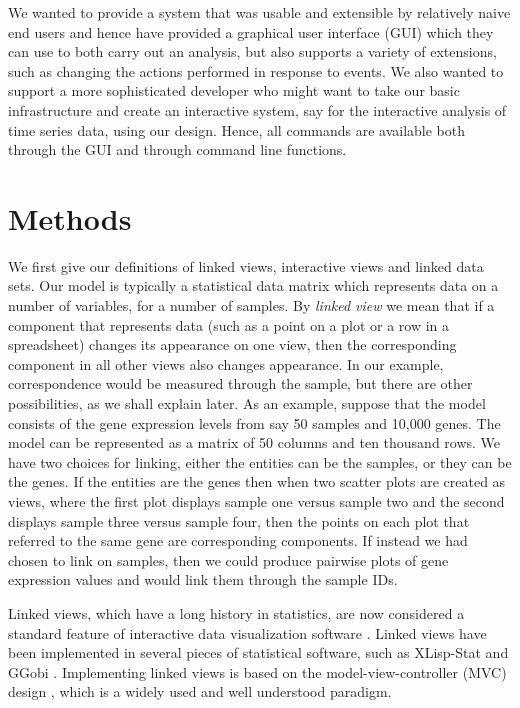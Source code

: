 \documentclass{article}[11pt]
\begin{document}
We wanted to provide a system that was usable and extensible by
relatively naive end users and hence have provided a graphical user
interface (GUI) which they can use to both carry out an analysis, but
also supports a variety of extensions, such as changing the actions
performed in response to events. We also wanted to support a more
sophisticated developer who might want to take our basic infrastructure
and create an interactive system, say for the interactive analysis of
time series data, using our design. Hence, all commands are
available both through the GUI and through command line functions.

\section{Methods}

We first give our definitions of linked views, interactive views and
linked data sets. Our model is typically a statistical data
matrix which represents data on a number of variables, for a
number of samples.  By \textit{linked view} we mean that if a
component that represents data (such as a point on a plot or a row in
a spreadsheet) changes its appearance on one view, then the
corresponding component in all other views also changes appearance.
In our example, correspondence would be measured through the sample,
but there are other possibilities, as we shall explain later.  As an
example, suppose that the model consists of the gene expression levels
from say 50 samples and 10,000 genes.  The model can be represented as
a matrix of 50 columns and ten thousand rows.  We have two choices for
linking, either the entities can be the samples, or they can be the
genes. If the entities are the genes then when two scatter plots are
created as views, where the first plot displays sample one versus sample two 
and the second displays sample three versus sample four, then the points
on each plot that referred to the same gene are corresponding
components.  If instead we had chosen to link on samples, then we
could produce pairwise plots of gene expression values and would link
them through the sample IDs.

Linked views, which have a long history in statistics, are now
considered a standard feature of interactive data visualization
software \cite{GGobi}.  Linked views have been implemented in several
pieces of statistical software, such as XLisp-Stat \cite{Lisp} and
GGobi \cite{GGobiMan}.  Implementing linked views is based on the
model-view-controller (MVC) design \cite{DesignPatterns}, which is a
widely used and well understood paradigm. 
\end{document}
